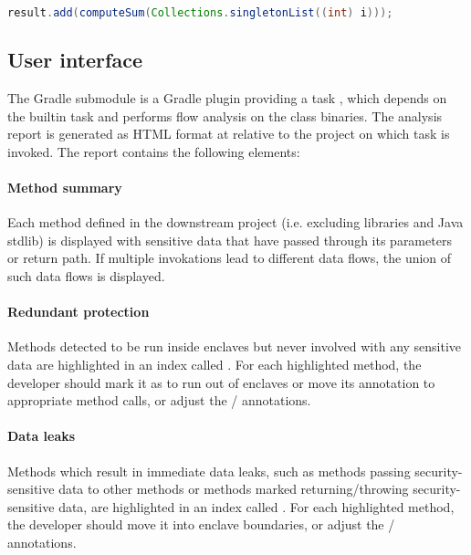 \begin{lstlisting}[style=j, language=java, label={lst:computeSum},
caption={Example of leak through computeSum}]
	result.add(computeSum(Collections.singletonList((int) i)));
\end{lstlisting}

\subsection{User interface}
The  Gradle submodule
is a Gradle plugin providing a task ,
which depends on the  builtin task
and performs flow analysis on the class binaries.
The analysis report is generated as HTML format at
relative to the project on which task is invoked.
The report contains the following elements:

\paragraph{Method summary}
Each method defined in the downstream project (i.e. excluding libraries and Java stdlib)
is displayed with sensitive data that have passed through its parameters or return path.
If multiple invokations lead to different data flows,
the union of such data flows is displayed.

\paragraph{Redundant protection}
Methods detected to be run inside enclaves but never involved with any sensitive data
are highlighted in an index called .
For each highlighted method, the developer
should mark it as  to run out of enclaves
or move its  annotation to appropriate method calls,
or adjust the / annotations.

\paragraph{Data leaks}
Methods which result in immediate data leaks,
such as methods passing security-sensitive data to other  methods
or methods marked  returning/throwing security-sensitive data,
are highlighted in an index called .
For each highlighted method, the developer
should move it into enclave boundaries,
or adjust the / annotations.

